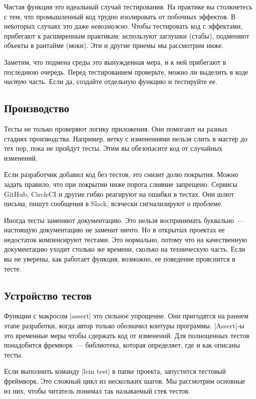 Чистая функция это идеальный случай тестирования. На практике вы столкнетесь с
тем, что промышленный код трудно изолировать от побочных эффектов. В некоторых
случаях это даже \emph{невозможно}. Чтобы тестировать код с эффектами, прибегают
к расширенным практикам: используют заглушки (стабы), подменяют объекты в
рантайме (моки). Эти и другие приемы мы рассмотрим ниже.

Заметим, что подмена среды это вынужденная мера, и к ней прибегают в последнюю
очередь. Перед тестированием проверьте, можно ли выделить в коде \emph{чистую}
часть. Если да, создайте отдельную функцию и тестируйте ее.

\subsection{Производство}

Тесты не только проверяют логику приложения. Они помогают на разных стадиях
производства. Например, ветку с изменениями нельзя слить в мастер до тех пор,
пока не пройдут тесты. Этим вы обезопасите код от случайных изменений.

Если разработчик добавил код без тестов, это снизит долю покрытия. Можно задать
правило, что при покрытии ниже порога слияние запрещено. Сервисы GitHub,
CircleCI и другие гибко реагируют на ошибки в тестах. Они шлют письма, пишут
сообщения в Slack, всячески сигнализируют о проблеме.

Иногда тесты заменяют документацию. Это нельзя воспринимать буквально~---
настоящую документацию не заменит ничто. Но в открытых проектах ее недостаток
компенсируют тестами. Это нормально, потому что на качественную документацию
уходит столько же времени, сколько на техническую часть. Если вы не уверены, как
работает функция, возможно, ее поведение прояснится в тесте.

\subsection{Устройство тестов}

Функции с макросом \spverb|assert| это сильное упрощение. Они пригодятся на
раннем этапе разработки, когда автор только обозначил контуры
программы. \spverb|Assert|-ы это временные меры чтобы сдержать код от
изменений. Для полноценных тестов понадобится фремворк~--- библиотека, которая
определяет, где и как описаны тесты.

Если выполнить команду \spverb|lein test| в папке проекта, запустится тестовый
фреймворк. Это сложный цикл из нескольких шагов. Мы рассмотрим основные из них,
чтобы читатель понимал так называемый стек тестов.

